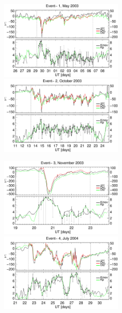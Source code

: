 \documentclass[a4paper,fleqn]{cas-dc}
\begin{document}
\begin{figure}[h!]
    \centering
    \centerline{\Large \bf   
         \hfill}
          \centerline{\Large \bf   
      \hspace{0.26\textwidth}  \color{black}{}
       \hspace{0.31\textwidth}  \color{black}{}
         \hfill}
     \includegraphics[width=6.0cm]{images/dH_approx/diono_valid_V4_2003-05-26.eps}
     \includegraphics[width=6.0cm]{images/dH_approx/diono_valid_V4_2003-10-11.eps}
     \centerline{\Large \bf   
      \hspace{0.275\textwidth}  \color{black}{}
       \hspace{0.295\textwidth}  \color{black}{}
         \hfill}
     \includegraphics[width=6.0cm]{images/dH_approx/diono_valid_V4_2003-11-19.eps}     
     \includegraphics[width=6.0cm]{images/dH_approx/diono_valid_V4_2004-07-21.eps}

\end{figure}
\end{document}
